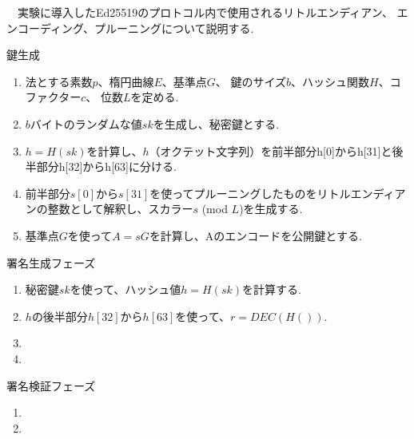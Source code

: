 　実験に導入したEd25519のプロトコル内で使用されるリトルエンディアン、
エンコーディング、プルーニングについて説明する.\\


\begin{itembox}[l]{鍵生成}
  \begin{enumerate}[parsep=7pt]
    \item 法とする素数$p$、楕円曲線$E$、基準点$G$、
                  鍵のサイズ$b$、ハッシュ関数$H$、コファクター$c$、
                  位数$L$を定める.
    \item $b$バイトのランダムな値$sk$を生成し、秘密鍵とする.
    \item $h = H(sk)$を計算し、$h$（オクテット文字列）を前半部分h[0]からh[31]と後半部分h[32]からh[63]に分ける.
    \item 前半部分$s[0]$から$s[31]$を使ってプルーニングしたものをリトルエンディアンの整数として解釈し、スカラー$s$ (mod $L$)を生成する.
    \item 基準点$G$を使って$A = sG$を計算し、Aのエンコードを公開鍵とする.
  \end{enumerate}
\end{itembox}
  
\begin{itembox}[l]{署名生成フェーズ}
  \begin{enumerate}[parsep=7pt]
    \item 秘密鍵$sk$を使って、ハッシュ値$h=H(sk)$を計算する.
    \item $h$の後半部分$h[32]$から$h[63]$を使って、$r = DEC(H())$.
    \item
    \item
  \end{enumerate}
\end{itembox}

\begin{itembox}[l]{署名検証フェーズ}
  \begin{enumerate}[parsep=7pt]
    \item
    \item
  \end{enumerate}
\end{itembox}